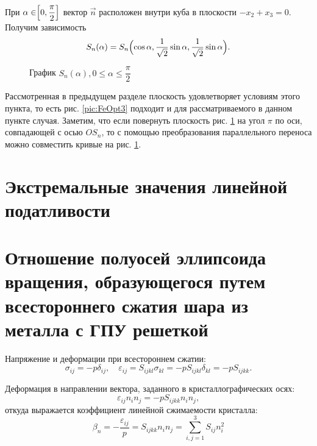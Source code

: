 \documentclass[12pt,a4paper]{article}
\newcommand{\picref}[1]{рис. \ref{#1}}
\begin{document}
 При $\alpha \in \Bigr[ 0, \dfrac{\pi}{2} \Bigl]$ вектор $ \vec n $ расположен внутри куба в плоскости $ -x_2 + x_3 = 0 $. Получим зависимость 
 \[
	S_n(\alpha) = S_n \Bigl( \cos \alpha, \dfrac{1}{\sqrt 2} \sin \alpha, \dfrac{1}{\sqrt 2} \sin \alpha \Bigr).
 \] 

 \begin{figure}[h]
	\caption{График $S_n(\alpha), 0 \leq \alpha \leq \dfrac{\pi}{2}$}
	\label{pic:FeOpt4}
\end{figure}

 Рассмотренная в предыдущем разделе плоскость удовлетворяет условиям этого пункта, то есть \picref{pic:FeOpt3} подходит и для рассматриваемого в данном пункте случая. Заметим, что если повернуть плоскость \picref{pic:FeOpt4} на угол $\pi$ по оси, совпадающей с осью $OS_n$, то с помощью преобразования параллельного переноса можно совместить кривые на \picref{pic:FeOpt4}.

 \section{Экстремальные значения линейной податливости}

 

 \section{Отношение полуосей эллипсоида вращения, образующегося путем всестороннего сжатия шара из металла с ГПУ решеткой}

 Напряжение и деформации при всестороннем сжатии:
 \[
   \sigma_{ij} = - p \delta_{ij}, \quad \varepsilon_{ij} = S_{ijkl} \sigma_{kl} = -p S_{ijkl} \delta_{kl} = -p S_{ijkk}.
 \]

 Деформация в направлении вектора, заданного в кристаллографических осях:
 \[
    \varepsilon_{ij} n_i n_j = -p S_{ijkk} n_i n_j,
 \]  
 \noindent откуда выражается коэффициент линейной сжимаемости кристалла:
 \[
    \beta_n = - \dfrac{\varepsilon_{ij}}{p} = S_{ijkk} n_i n_j = \sum \limits_{i, j = 1}^{3} S_{ij} n_i^2
 \]
\end{document}
